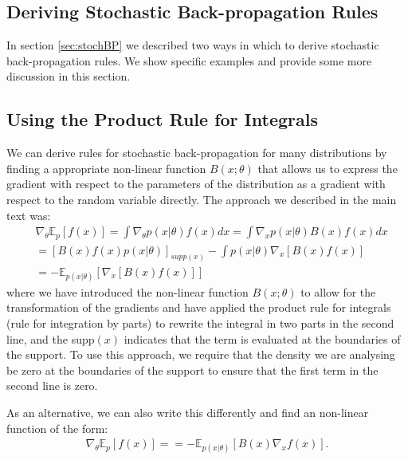 \documentclass{article}
\newcommand{\E}{\mathbb{E}} %
\begin{document}
\begin{bibunit}[icml2013]
\section{Deriving Stochastic Back-propagation Rules}
\label{app:otherStochBPrule}
In section \ref{sec:stochBP} we described two ways in which to derive 
stochastic back-propagation rules. We show specific examples and provide 
some more discussion in this section.
\subsection{Using the Product Rule for Integrals}
We can derive rules for stochastic back-propagation for many distributions by finding a appropriate non-linear function $B(x; \theta)$ that allows us to express the gradient with respect to the parameters of the distribution as a gradient with respect to the random variable directly. The approach we described in the main text was:
\begin{align}
& \nabla_{\theta} \E_{p} [f(x)] \!=\!\! 
\int \!\nabla_{\theta} p (\!x | \theta )\! f\!(\!x\!) d x  
\!=\!\! \int \!\nabla_x p (\!x | \theta ) B (\!x\!) f\!(\!x\!) d x \nonumber \\
& =  [B (x) f (x) p ( x | \theta)]_{supp (x)} - \int p
(x | \theta) \nabla_x [B (x) f (x)]   \nonumber \\
& =  -\E_{p (x | \theta )} [\nabla_x [B (x) f (x)]]  \label{eq:app_prodRuleSBP}
\end{align}
where we have introduced the non-linear function $B(x;\theta)$ to allow for the transformation of the gradients and have applied the product rule for integrals (rule for integration by parts) to rewrite the integral in two parts in the second line, and the supp$(x)$ indicates that the term is evaluated at the boundaries of the support. To use this approach, we require that the density we are analysing be zero at the boundaries of the support to ensure that the first term in the second line is zero.

As an alternative, we can also write this differently and find an non-linear function of the form:
\begin{align}
\nabla_{\theta} \E_{p} [f(x)] \!=\!\! =  -\E_{p (x | \theta )} [B (x) \nabla_x  f (x)]. 
\end{align}


\end{bibunit}
\end{document}
